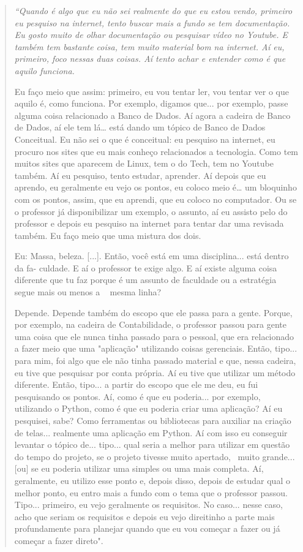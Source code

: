 \begin{quote}
    \itshape
    “Quando é algo que eu não sei realmente do que eu estou vendo, primeiro eu pesquiso na internet, tento buscar mais a fundo se tem documentação. Eu gosto muito de olhar documentação ou pesquisar vídeo no Youtube. E também tem bastante coisa, tem muito material bom na internet. Aí eu, primeiro, foco nessas duas coisas. Aí tento achar e entender como é que aquilo funciona.

    Eu faço meio que assim: primeiro, eu vou tentar ler, vou tentar ver o que aquilo é, como funciona. Por exemplo, digamos que... por exemplo, passe alguma coisa relacionado a Banco de Dados. Aí agora a cadeira de Banco de Dados, aí ele tem lá… está dando um tópico de Banco de Dados Conceitual. Eu não sei o que é conceitual: eu pesquiso na internet, eu procuro nos sites que eu mais conheço relacionados a tecnologia. Como tem muitos sites que aparecem de Linux, tem o do Tech, tem no Youtube também. Aí eu pesquiso, tento estudar, aprender. Aí depois que eu aprendo, eu geralmente eu vejo os pontos, eu coloco meio é… um bloquinho com os pontos, assim, que eu aprendi, que eu coloco no computador. Ou se o professor já disponibilizar um exemplo, o assunto, aí eu assisto pelo do professor e depois eu pesquiso na internet para tentar dar uma revisada também. Eu faço meio que uma mistura dos dois.

    \colorbox{black!15}{Eu: Massa, beleza. [...]. Então, você está em uma disciplina... está dentro da fa-} 
    \colorbox{black!15}{culdade. E aí o professor te exige algo. E aí existe alguma coisa diferente que tu} 
    \colorbox{black!15}{faz porque é um assunto de faculdade ou a estratégia segue mais ou menos a } \mbox{    } \colorbox{black!15}{mesma linha?}

    Depende. Depende também do escopo que ele passa para a gente. Porque, por exemplo, na cadeira de Contabilidade, o professor passou para gente uma coisa que ele nunca tinha passado para o pessoal, que era relacionado a fazer meio que uma "aplicação" utilizando coisas gerenciais. Então, tipo... para mim, foi algo que ele não tinha passado material e que, nessa cadeira, eu tive que pesquisar por conta própria. Aí eu tive que utilizar um método diferente. Então, tipo... a partir do escopo que ele me deu, eu fui pesquisando os pontos. Aí, como é que eu poderia... por exemplo, utilizando o Python, como é que eu poderia criar uma aplicação? Aí eu pesquisei, sabe? Como ferramentas ou bibliotecas para auxiliar na criação de telas... realmente uma aplicação em Python. Aí com isso eu conseguir levantar o tópico de... tipo... qual seria a melhor para utilizar em questão do tempo do projeto, se o projeto tivesse muito apertado,  muito grande... [ou] se eu poderia utilizar uma simples ou uma mais completa. Aí, geralmente, eu utilizo esse ponto e, depois disso, depois de estudar qual o melhor ponto, eu entro mais a fundo com o tema que o professor passou. Tipo... primeiro, eu vejo geralmente os requisitos. No caso... nesse caso, acho que seriam os requisitos e depois eu vejo direitinho a parte mais profundamente para planejar quando que eu vou começar a fazer ou já começar a fazer direto". 
\end{quote}

